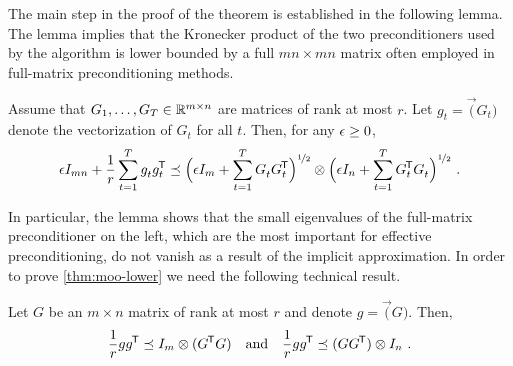 The main step in the proof of the theorem is established in the following lemma. The lemma
implies that the Kronecker product of the two preconditioners used by the
algorithm is lower bounded by a full $mn \times mn$ matrix often
employed in full-matrix preconditioning methods.

\begin{lemma} \label{thm:moo-lower}
Assume that $G_1,\ldots,G_T \in \mathbb{R}^{m \times n}$ are matrices of
rank at most $r$. Let $g_t = \vec(G_t)$ denote the vectorization of $G_t$ for
all $t$.  Then, for any $\epsilon \ge 0$,
\begin{align*}
\epsilon I_{mn} + \frac{1}{r} \sum_{t=1}^T g_t^{} g_t^{\mkern-1.5mu\scriptstyle\mathsf{T}}
\preceq
	\mathopen{}\Big(\epsilon I_{m} +
	\sum_{t=1}^T G_t^{} G_t^{\mkern-1.5mu\scriptstyle\mathsf{T}}\Big)^{{\smash{\nicefrac{1}{2}}}} \otimes \mathopen{}\Big(\epsilon I_{n} +
	\sum_{t=1}^T G_t^{\mkern-1.5mu\scriptstyle\mathsf{T}} G_t^{}\Big)^{{\smash{\nicefrac{1}{2}}}} ~ .
\end{align*}
\end{lemma}
%
In particular, the lemma shows that the small eigenvalues of the full-matrix preconditioner
on the left, which are the most important for effective preconditioning, do
not vanish as a result of the implicit approximation.
%
In order to prove \cref{thm:moo-lower} we need the following technical
result.
%
\begin{lemma} \label{lem:kron-base}
Let $G$ be an $m \times n$ matrix of rank at most $r$ and denote $g =
\vec(G)$. Then,
\begin{align*}
\frac{1}{r} gg^{\mkern-1.5mu\scriptstyle\mathsf{T}}
\preceq
I_{m} \otimes (G^{\mkern-1.5mu\scriptstyle\mathsf{T}} G)
\quad\text{and}\quad
\frac{1}{r} gg^{\mkern-1.5mu\scriptstyle\mathsf{T}}
\preceq
(GG^{\mkern-1.5mu\scriptstyle\mathsf{T}}) \otimes I_{n}
~ .
\end{align*}
\end{lemma}
%
